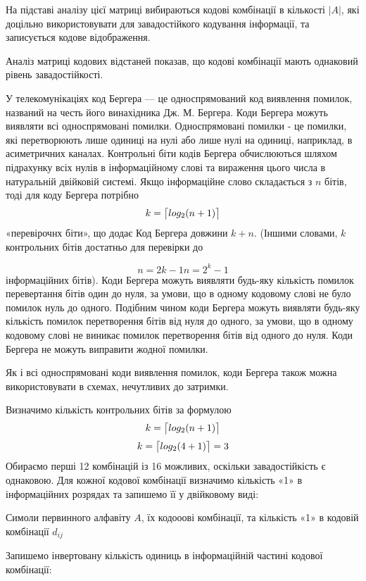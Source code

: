 \documentclass[a4paper,14pt]{extreport}
\DeclarePairedDelimiter{\ceil}{\lceil}{\rceil}
\begin{document}
На підставі аналізу цієї матриці вибираються кодові комбінації в кількості $|A|$, які
доцільно використовувати для завадостійкого кодування
інформації, та записується кодове відображення.

Аналіз матриці кодових відстаней показав, що кодові комбінації мають однаковий рівень завадостійкості.

У телекомунікаціях код Бергера — це односпрямований код виявлення помилок, названий на честь його винахідника Дж. М. Бергера. Коди Бергера можуть виявляти всі односпрямовані помилки. Односпрямовані помилки - це помилки, які перетворюють лише одиниці на нулі або лише нулі на одиниці, наприклад, в асиметричних каналах. Контрольні біти кодів Бергера обчислюються шляхом підрахунку всіх нулів в інформаційному слові та вираження цього числа в натуральній двійковій системі. Якщо інформаційне слово складається з $n$ бітів, тоді для коду Бергера потрібно 
$$k = \ceil[\big]{log_2 ( n + 1 )} $$  «перевірочнх біти», що додає Код Бергера довжини $k+n$. (Іншими словами,  $k$ контрольних бітів достатньо для перевірки до

 $$ n = 2 k - 1 n=2^{k}-1$$ 
інформаційних бітів). Коди Бергера можуть виявляти будь-яку кількість помилок перевертання бітів один до нуля, за умови, що в одному кодовому слові не було помилок нуль до одного. Подібним чином коди Бергера можуть виявляти будь-яку кількість помилок перетворення бітів від нуля до одного, за умови, що в одному кодовому слові не виникає помилок перетворення бітів від одного до нуля. Коди Бергера не можуть виправити жодної помилки.

Як і всі односпрямовані коди виявлення помилок, коди Бергера також можна використовувати в схемах, нечутливих до затримки.

Визначимо кількість контрольних бітів за формулою 
$$k = \ceil[\big]{log_2 ( n + 1 )} $$ 
$$k = \ceil[\big]{log_2 ( 4 + 1 )} = 3  $$ 
Обираємо перші 12 комбінацій із 16 можливих, оскільки завадостійкість є однаковою.  Для кожної кодової комбінації визначимо
кількість «1» в інформаційних розрядах та
запишемо її у двійковому виді:
\begin{table}[H]
	\caption{Симоли первинного алфавіту $A$, їх кодооові комбінації, та кількість «1» в кодовій комбінації $d_{ij}$}
	\centering
	
	\label{table:codewords-control_bits}
\end{table}

Запишемо інвертовану кількість одиниць в
інформаційній частині кодової комбінації:
\end{document}
